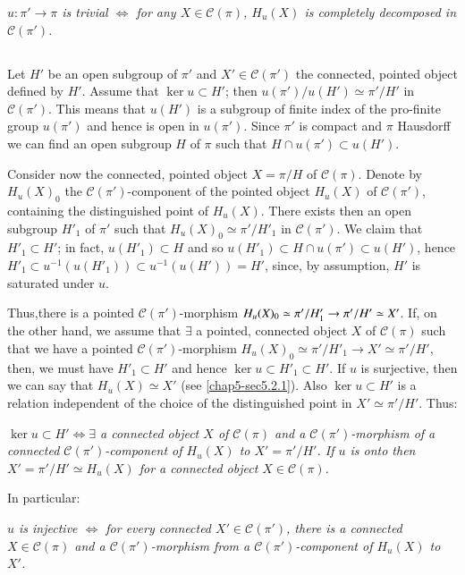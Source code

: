 {\em $u:\pi'\to \pi$ is trivial $\Leftrightarrow$ for any
  $X\in\mathscr{C}(\pi)$, $H_{u}(X)$ is completely decomposed in
  $\mathscr{C}(\pi')$.} 

\subsection{}\label{chap5-sec5.2.4}
Let $H'$ be an open subgroup of $\pi'$ and $X'\in\mathscr{C}(\pi')$
the connected, pointed object defined by $H'$. Assume that $\ker
u\subset H'$; then $u(\pi')/u(H')\simeq \pi'/H'$ in
$\mathscr{C}(\pi')$. This means that $u(H')$ is a subgroup of finite
index of the pro-finite group $u(\pi')$ and hence is open in
$u(\pi')$. Since $\pi'$ is compact and $\pi$ Hausdorff we can find an
open subgroup $H$ of $\pi$ such that $H\cap u(\pi')\subset u(H')$.

Consider now the connected, pointed object $X=\pi/H$ of
$\mathscr{C}(\pi)$. Denote by $H_{u}(X)_{0}$ the
$\mathscr{C}(\pi')$-component of the pointed object $H_{u}(X)$ of
$\mathscr{C}(\pi')$, containing the distinguished point of
$H_{u}(X)$. There exists then an open subgroup $H'_{1}$ of $\pi'$ such
that $H_{u}(X)_{0}\simeq \pi'/H'_{1}$ in $\mathscr{C}(\pi')$. We claim
that $H'_{1}\subset H'$; in fact, $u(H'_{1})\subset H$ and so
$u(H'_{1})\subset H\cap u(\pi')\subset u(H')$, hence $H'_{1}\subset
u^{-1}(u(H'_{1}))\subset u^{-1}(u(H'))=H'$, since, by assumption, $H'$
is saturated under $u$.

Thus,\pageoriginale there is a pointed $\mathscr{C}(\pi')$-morphism
$H_{u}(X)_{0}\simeq \pi'/H'_{1}\to \pi'/H'\break \simeq X'$. If, on the other
hand, we assume that $\exists$ a pointed, connected object $X$ of
$\mathscr{C}(\pi)$ such that we have a pointed
$\mathscr{C}(\pi')$-morphism $H_{u}(X)_{0}\simeq \pi'/H'_{1}\to
X'\simeq \pi'/H'$, then, we must have $H'_{1}\subset H'$ and hence
$\ker u\subset H'_{1}\subset H'$. If $u$ is surjective, then we can
say that $H_{u}(X)\simeq X'$ (see \ref{chap5-sec5.2.1}). Also $\ker u\subset
H'$ is a relation independent of the choice of the distinguished point
in $X'\simeq \pi'/H'$. Thus:

{\em $\ker u\subset H'\Leftrightarrow \exists$ a connected object $X$
  of $\mathscr{C}(\pi)$ and a $\mathscr{C}(\pi')$-mor\-phism of a
  connected $\mathscr{C}(\pi')$-component of $H_{u}(X)$ to
  $X'=\pi'/H'$. If $u$ is onto then $X'=\pi'/H'\simeq H_{u}(X)$ for a
  connected object $X\in\mathscr{C}(\pi)$.}

In particular:

{\em $u$ is injective $\Leftrightarrow$ for every connected $X'\in
  \mathscr{C}(\pi')$, there is a connected $X\in\mathscr{C}(\pi)$ and
  a $\mathscr{C}(\pi')$-morphism from a $\mathscr{C}(\pi')$-component
  of $H_{u}(X)$ to $X'$.}

